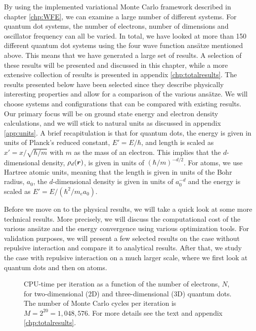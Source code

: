 By using the implemented variational Monte Carlo framework described in chapter \ref{chp:WFE}, we can examine a large number of different systems. For quantum dot systems, the number of electrons, number of dimensions and oscillator frequency can all be varied. In total, we have looked at more than 150 different quantum dot systems using the four wave function ansätze mentioned above. This means that we have generated a large set of results. A selection of these results will be presented and discussed in this chapter, while a more extensive collection of results is presented in appendix \ref{chp:totalresults}. The results presented below have been selected since they describe physically interesting properties and allow for a comparison of the various ansätze. We will choose systems and configurations that can be compared with existing results. Our primary focus will be on ground state energy and electron density calculations, and we will stick to natural units as discussed in appendix \ref{app:units}. A brief recapitulation is that for quantum dots, the energy is given in units of Planck's reduced constant, $E'=E/\hbar$, and length is scaled as $x'=x/\sqrt{\hbar/m}$ with $m$ as the mass of an electron. This implies that the $d$-dimensional density, $\rho_d(\boldsymbol{{r}})$, is given in units of $(\hbar/m)^{-d/2}$. For atoms, we use Hartree atomic units, meaning that the length is given in units of the Bohr radius, $a_0$, the $d$-dimensional density is given in units of $a_0^{-d}$ and the energy is scaled as $E'=E/(\hbar^2/m_ea_0)$.

Before we move on to the physical results, we will take a quick look at some more technical results. More precisely, we will discuss the computational cost of the various ansätze and the energy convergence using various optimization tools. For validation purposes, we will present a few selected results on the case without repulsive interaction and compare it to analytical results. After that, we study the case with repulsive interaction on a much larger scale, where we first look at quantum dots and then on atoms. 

\begin{figure}
	\centering 
	
	\caption{CPU-time per iteration as a function of the number of electrons, $N$, for two-dimensional (2D) and three-dimensional (3D) quantum dots. The number of Monte Carlo cycles per iteration is $M=2^{20}=1,048,576$. For more details see the text and appendix \ref{chp:totalresults}.}
	\label{fig:cpu_time}
\end{figure} 

